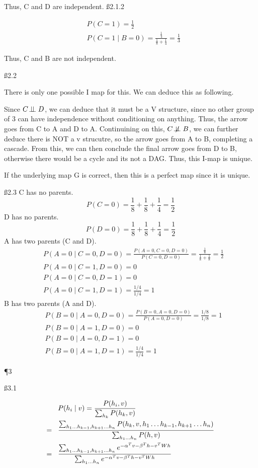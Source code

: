 Thus, C and D are independent.
\ss{2.1.2}

\begin{align*}
& P(C = 1) = \frac{1}{2} \\
& P(C = 1 \mid B = 0) = \frac{\frac{1}{4}}{\frac{1}{8} + \frac{1}{4}} = \frac{1}{3}
\end{align*}

Thus, C and B are not independent.

\ss{2.2}

There is only one possible I map for this. We can deduce this as following.

Since $C \!\perp\!\!\!\perp D$, we can deduce that it must be a V structure, since no other group of 3 can have independence without conditioning on anything. Thus, the arrow goes from C to A and D to A. Continuining on this, $C \not \!\perp\!\!\!\perp B$, we can further deduce there is NOT a v strucutre, so the arrow goes from A to B, completing a cascade. From this, we can then conclude the final arrow goes from D to B, otherwise there would be a cycle and its not a DAG. Thus, this I-map is unique.

If the underlying map G is correct, then this is a perfect map since it is unique.

\ss{2.3}
C has no parents. 
\[P(C=0) = \frac{1}{8} + \frac{1}{8} + \frac{1}{4} = \frac{1}{2}
\]
D has no parents. 
\[P(D=0) = \frac{1}{8} + \frac{1}{8} + \frac{1}{4} = \frac{1}{2}
\]
A has two parents (C and D). 
\begin{align*}
& P(A=0 \mid C=0 , D=0) = \frac{P(A=0, C=0, D=0)}{P(C=0, D=0)} = \frac{\frac{1}{8}}{\frac{1}{8} + \frac{1}{8}} = \frac{1}{2} \\
& P(A=0 \mid C=1 , D=0) = 0 \\
& P(A=0 \mid C=0 , D=1) = 0 \\
& P(A=0 \mid C=1 , D=1) = \frac{1/4}{1/4} = 1
\end{align*}
B has two parents (A and D). 
\begin{align*}
& P(B=0 \mid A=0 , D=0) = \frac{P(B=0, A=0, D=0)}{P(A=0, D=0)} = \frac{1/8}{1/8} = 1 \\
& P(B=0 \mid A=1 , D=0) = 0 \\
& P(B=0 \mid A=0 , D=1) = 0 \\
& P(B=0 \mid A=1 , D=1) = \frac{1/4}{1/4} = 1
\end{align*}

\P 3

\ss{3.1}

\begin{align*}
& P (h_i \mid v) = \frac {P (h_i, v)}{\sum_{h_k} P(h_k, v)} \\
= \hspace{3 mm}&\frac {\sum_{h_1 \dots h_{k-1}, h_{k+1} \dots h_n} P (h_k, v, h_1 \dots h_{k-1}, h_{k+1} \dots h_n)}{\sum_{h_1 \dots h_n} P(h, v)} \\
=  \hspace{3 mm} & \frac {\sum_{h_1 \dots h_{k-1}, h_{k+1} \dots h_n} e^{-\alpha^Tv-\beta^Th-v^TWh}}{\sum_{h_1 \dots h_n} e^{-\alpha^Tv-\beta^Th-v^TWh}}
\end{align*}

